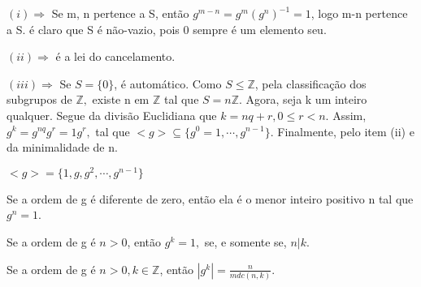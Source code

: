 \documentclass[Algebra/algebra_notes.tex]{subfiles}
\begin{document}
\begin{proof*}
	$(i)\Rightarrow$ Se m, n pertence a S, então $g^{m-n} = g^{m}(g^{n})^{-1} = 1$, logo m-n pertence a S. é claro que S é não-vazio, pois 0 sempre é um elemento seu.

	$(ii)\Rightarrow$ é a lei do cancelamento.

	$(iii)\Rightarrow$ Se $S = \{0\}$, é automático. Como $S\leq{\mathbb{Z}}$, pela classificação dos subgrupos de $\mathbb{Z},$
	existe n em $\mathbb{Z}$ tal que $S = n \mathbb{Z}$. Agora, seja k um inteiro qualquer. Segue da divisão Euclidiana que
	$k = nq + r, 0\leq{r}<n$. Assim, $g^{k} = g^{nq}g^{r} = 1g^{r},$ tal que $<g> \subseteq{\{g^{0}=1, \cdots, g^{n-1}\}}$. Finalmente, pelo
	item (ii) e da minimalidade de n. \qedsymbol
\end{proof*}
\begin{crl*}
	$<g> = \{1, g, g^{2}, \cdots, g^{n-1}\} $
\end{crl*}
\begin{crl*}
	Se a ordem de g é diferente de zero, então ela é o menor inteiro positivo n tal que $g^{n} = 1$.
\end{crl*}
\begin{crl*}
	Se a ordem de g é $n>{0}$, então $g^{k} = 1,$ se, e somente se, $n|k.$
\end{crl*}
\begin{crl*}
	Se a ordem de g é $n>0, k\in \mathbb{Z}$, então $|g^{k}|=\displaystyle \frac{n}{mdc(n, k)}$.
\end{crl*}
\end{document}
